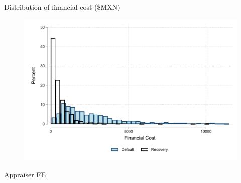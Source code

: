 \documentclass[8pt]{beamer}
\begin{document}
\begin{frame}{Distribution of financial cost (\$MXN)}
    \begin{figure}
     \centering
        \includegraphics[width=.8\textwidth]{Figuras/hist_fc.pdf}
    \end{figure}
    
    \hyperlink{fc_outcome}{}

\end{frame}


\begin{frame}{Appraiser FE}
\label{clerk_fe}
\begin{table}[H]
\begin{center}
\resizebox{0.95\textwidth}{!}{
\small{}
}
\end{center}
 \scriptsize 
 
\end{table}
    \hyperlink{main_results}{}

\end{frame}
\end{document}
